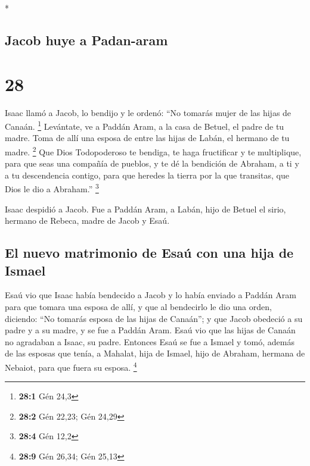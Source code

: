 \begin{paracol}{2}
\begin{otherlanguage}{english}
\end{otherlanguage}

\switchcolumn[0]*

\hypertarget{jacob-huye-a-padan-aram}{%
\subsection{Jacob huye a Padan-aram}\label{jacob-huye-a-padan-aram}}

\hypertarget{section-54}{%
\section{28}\label{section-54}}

 Isaac llamó a Jacob, lo bendijo y le ordenó: ``No tomarás
mujer de las hijas de Canaán. \footnote{\textbf{28:1} Gén 24,3}
 Levántate, ve a Paddán Aram, a la casa de Betuel, el
padre de tu madre. Toma de allí una esposa de entre las hijas de Labán,
el hermano de tu madre. \footnote{\textbf{28:2} Gén 22,23; Gén 24,29}
 Que Dios Todopoderoso te bendiga, te haga fructificar y
te multiplique, para que seas una compañía de pueblos,  y
te dé la bendición de Abraham, a ti y a tu descendencia contigo, para
que heredes la tierra por la que transitas, que Dios le dio a Abraham.''
\footnote{\textbf{28:4} Gén 12,2}

 Isaac despidió a Jacob. Fue a Paddán Aram, a Labán, hijo
de Betuel el sirio, hermano de Rebeca, madre de Jacob y Esaú.

\hypertarget{el-nuevo-matrimonio-de-esauxfa-con-una-hija-de-ismael}{%
\subsection{El nuevo matrimonio de Esaú con una hija de
Ismael}\label{el-nuevo-matrimonio-de-esauxfa-con-una-hija-de-ismael}}

 Esaú vio que Isaac había bendecido a Jacob y lo había
enviado a Paddán Aram para que tomara una esposa de allí, y que al
bendecirlo le dio una orden, diciendo: ``No tomarás esposa de las hijas
de Canaán'';  y que Jacob obedeció a su padre y a su
madre, y se fue a Paddán Aram.  Esaú vio que las hijas de
Canaán no agradaban a Isaac, su padre.  Entonces Esaú se
fue a Ismael y tomó, además de las esposas que tenía, a Mahalat, hija de
Ismael, hijo de Abraham, hermana de Nebaiot, para que fuera su esposa.
\footnote{\textbf{28:9} Gén 26,34; Gén 25,13}


\end{paracol}
